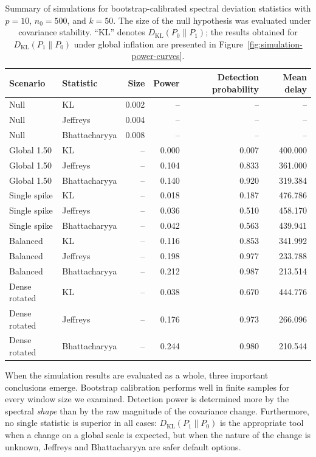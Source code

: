 \documentclass[11pt,a4paper]{article}
\newcommand{\KL}{\mathrm{KL}}
\begin{document}
\begin{table}[htbp]
\centering
\caption{Summary of simulations for bootstrap-calibrated spectral deviation
         statistics with $p=10$, $n_{0}=500$, and $k=50$.  The size of the null hypothesis
         was evaluated under covariance stability.  ``KL'' denotes $D_{\KL}(P_{0}\|P_{1})$;
         the results obtained for $D_{\KL}(P_{1}\|P_{0})$ under global inflation
         are presented in Figure~\ref{fig:simulation-power-curves}.}
\label{tab:simulation-summary}
\scriptsize
\setlength{\tabcolsep}{4pt}
\begin{tabular}{llrrrr}
\toprule
Scenario & Statistic & Size & Power & Detection probability & Mean delay \\
\midrule
Null          & KL            & 0.002 & --    & --    & --      \\
Null          & Jeffreys      & 0.004 & --    & --    & --      \\
Null          & Bhattacharyya & 0.008 & --    & --    & --      \\
\midrule
Global 1.50   & KL            & --    & 0.000 & 0.007 & 400.000 \\
Global 1.50   & Jeffreys      & --    & 0.104 & 0.833 & 361.000 \\
Global 1.50   & Bhattacharyya & --    & 0.140 & 0.920 & 319.384 \\
\midrule
Single spike  & KL            & --    & 0.018 & 0.187 & 476.786 \\
Single spike  & Jeffreys      & --    & 0.036 & 0.510 & 458.170 \\
Single spike  & Bhattacharyya & --    & 0.042 & 0.563 & 439.941 \\
\midrule
Balanced      & KL            & --    & 0.116 & 0.853 & 341.992 \\
Balanced      & Jeffreys      & --    & 0.198 & 0.977 & 233.788 \\
Balanced      & Bhattacharyya & --    & 0.212 & 0.987 & 213.514 \\
\midrule
Dense rotated & KL            & --    & 0.038 & 0.670 & 444.776 \\
Dense rotated & Jeffreys      & --    & 0.176 & 0.973 & 266.096 \\
Dense rotated & Bhattacharyya & --    & 0.244 & 0.980 & 210.544 \\
\bottomrule
\end{tabular}
\end{table}

When the simulation results are evaluated as a whole, three important conclusions emerge. Bootstrap
calibration performs well in finite samples for every window size
we examined. Detection power is determined more by the spectral \emph{shape} than by
the raw magnitude of the covariance change. Furthermore, no single statistic
is superior in all cases: $D_{\KL}(P_{1}\|P_{0})$ is the appropriate tool
when a change on a global scale is expected, but when the nature of the change is unknown, Jeffreys and Bhattacharyya are safer
default options.
\end{document}
